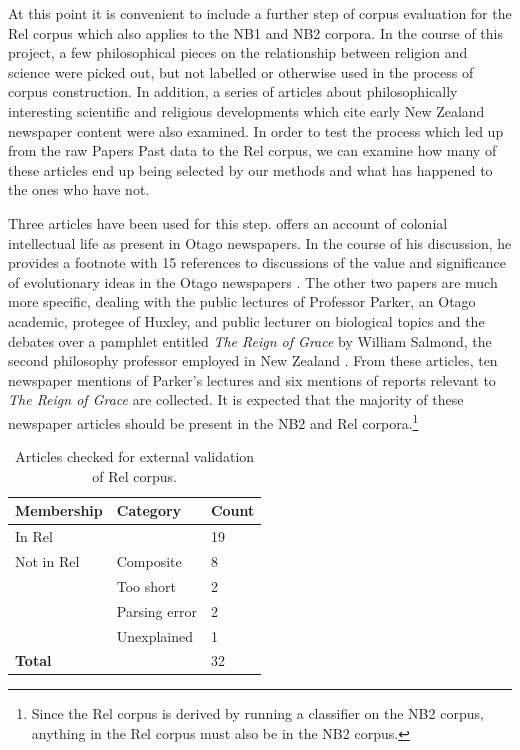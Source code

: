 \documentclass{article}
\begin{document}
At this point it is convenient to include a further step of corpus evaluation for the Rel corpus which also applies to the NB1 and NB2 corpora. In the course of this project, a few philosophical pieces on the relationship between religion and science were picked out, but not labelled or otherwise used in the process of corpus construction. In addition, a series of articles about philosophically interesting scientific and religious developments which cite early New Zealand newspaper content were also examined. In order to test the process which led up from the raw Papers Past data to the Rel corpus, we can examine how many of these articles end up being selected by our methods and what has happened to the ones who have not.

Three articles have been used for this step. \cite{ballantyne-2012} offers an account of colonial intellectual life as present in Otago newspapers. In the course of his discussion, he provides a footnote with 15 references to discussions of the value and significance of evolutionary ideas in the Otago newspapers \cite[fn. 53]{ballantyne-2012}. The other two papers are much more specific, dealing with the public lectures of Professor Parker, an Otago academic, protegee of Huxley, and public lecturer on biological topics \cite{crane-2013} and the debates over a pamphlet entitled \emph{The Reign of Grace} by William Salmond, the second philosophy professor employed in New Zealand \cite{wood-2014}. From these articles, ten newspaper mentions of Parker's lectures and six mentions of reports relevant to \textit{The Reign of Grace} are collected. It is expected that the majority of these newspaper articles should be present in the NB2 and Rel corpora.\footnote{Since the Rel corpus is derived by running a classifier on the NB2 corpus, anything in the Rel corpus must also be in the NB2 corpus.}

\begin{table}
  \centering
  \begin{tabular}{l|ll}
    \textbf{Membership} & \textbf{Category} & \textbf{Count} \\
    \hline
    In Rel & & 19 \\
    \hline
    Not in Rel & Composite & 8 \\
     & Too short & 2 \\
     & Parsing error & 2 \\
    & Unexplained & 1 \\
    \hline
    \textbf{Total} & & 32 \\
  \end{tabular}
  \label{t:ext-val}
  \caption{Articles checked for external validation of Rel corpus.}
\end{table}
\end{document}
